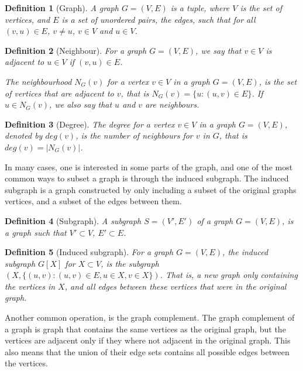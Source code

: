 \documentclass{amsart}
\newtheorem{definition}{Definition}[section]
\begin{document}
\begin{definition}[Graph]
    A graph $G = (V,E)$ is a tuple, where $V$ is the set of vertices, and $E$ is
    a set of unordered pairs, the edges, such that for all $(v,u) \in E$,
    $v \neq u$, $v \in V$ and $u \in V$.
\end{definition}
\begin{definition}[Neighbour]
    For a graph $G = (V,E)$, we say that $v \in V$ is adjacent to 
    $u \in V$ if $(v,u) \in E$. 

    The neighbourhood $N_G(v)$ for a vertex $v \in V$ in a graph $G = (V,E)$,
    is the set of vertices that are adjacent to $v$, that is 
    $N_G(v) = \{u : (u,v) \in E \}$. If $u \in N_G(v)$, we also say
    that $u$ and $v$ are neighbours.
\end{definition}
\begin{definition}[Degree]
    The degree for a vertex $v \in V$ in a graph $G = (V,E)$, denoted by 
    $deg(v)$, is the number of neighbours for $v$ in $G$, that is 
    $deg(v) = |N_G(v)|$.
\end{definition}

In many cases, one is interested in some parts of the graph, and one of the
most common ways to subset a graph is through the induced subgraph. The induced
subgraph is a graph constructed by only including a subset of the original
graphs vertices, and a subset of the edges between them.

\begin{definition}[Subgraph]
    A subgraph $S = (V',E')$ of a graph $G = (V,E)$, is a graph such that
    $V' \subset V$, $E' \subset E$.
\end{definition}

\begin{definition}[Induced subgraph]
    
    For a graph $G = (V,E)$, the induced subgraph $G[X]$ for $X \subset V$, is
    the subgraph $(X,\{(u,v) : (u,v) \in E, u \in X,v \in X\})$. That
    is, a new graph only containing the vertices in $X$, and all edges between
    these vertices that were in the original graph.

\end{definition}

Another common operation, is the graph complement. The graph complement of a
graph is graph that contains the same vertices as the original graph, but the
vertices are adjacent only if they where not adjacent in the original graph.
This also means that the union of their edge sets contains all possible edges
between the vertices.
\end{document}
